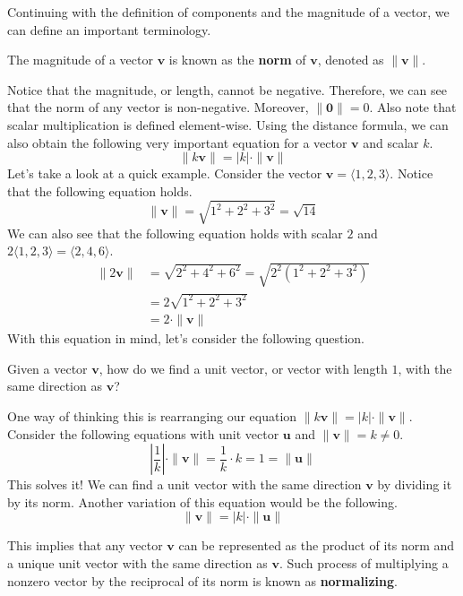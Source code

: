 \documentclass[../../main.tex]{subfiles}
\begin{document}
Continuing with the definition of components and the magnitude of a
vector, we can define an important terminology.

\begin{definition}{}{}
The magnitude of a vector $\mathbf{v}$ is known as the \textbf{norm}
of $\mathbf{v}$, denoted as $\| \mathbf{v} \|$.
\end{definition}

Notice that the magnitude, or length, cannot be negative. Therefore,
we can see that the norm of any vector is non-negative. Moreover,
$\| \mathbf{0} \| = 0$. Also note that scalar multiplication is
defined element-wise. Using the distance formula, we can also obtain
the following very important equation for a vector $\mathbf{v}$ and
scalar $k$.
\[
\| k \mathbf{v} \| = |k| \cdot \| \mathbf{v} \|
\]
Let's take a look at a quick example. Consider the vector
$\mathbf{v} = \langle 1, 2, 3 \rangle$. Notice that the following
equation holds.
\[
\| \mathbf{v} \|
= \sqrt{1^2 + 2^2 + 3^2}
= \sqrt{14}
\]
We can also see that the following equation holds with scalar $2$
and $2 \langle 1, 2, 3 \rangle = \langle 2, 4, 6 \rangle$.
\begin{align*}
    \| 2 \mathbf{v} \|
    &= \sqrt{2^2 + 4^2 + 6^2}
    = \sqrt{2^2 (1^2 + 2^2 + 3^2)} \\
    &= 2 \sqrt{1^2 + 2^2 + 3^2} \\
    &= 2 \cdot \| \mathbf{v} \|
\end{align*}
With this equation in mind, let's consider the following question.

\begin{important}
Given a vector $\mathbf{v}$, how do we find a unit vector, or
vector with length $1$, with the same direction as $\mathbf{v}$?
\end{important}

One way of thinking this is rearranging our equation
$\| k \mathbf{v} \| = |k| \cdot \| \mathbf{v} \|$. Consider the
following equations with unit vector $\mathbf{u}$ and
$\| \mathbf{v} \| = k \neq 0$.
\[
\left| \frac{1}{k} \right| \cdot \| \mathbf{v} \|
= \frac{1}{k} \cdot k
= 1
= \| \mathbf{u} \|
\]
This solves it! We can find a unit vector with the same direction
$\mathbf{v}$ by dividing it by its norm. Another variation of this
equation would be the following.
\[
\| \mathbf{v} \| = |k| \cdot \| \mathbf{u} \|
\]
\begin{important}
This implies that any vector $\mathbf{v}$ can be represented as
the product of its norm and a unique unit vector with the same
direction as $\mathbf{v}$. Such process of multiplying a nonzero
vector by the reciprocal of its norm is known as \textbf{normalizing}.
\end{important}
\end{document}
